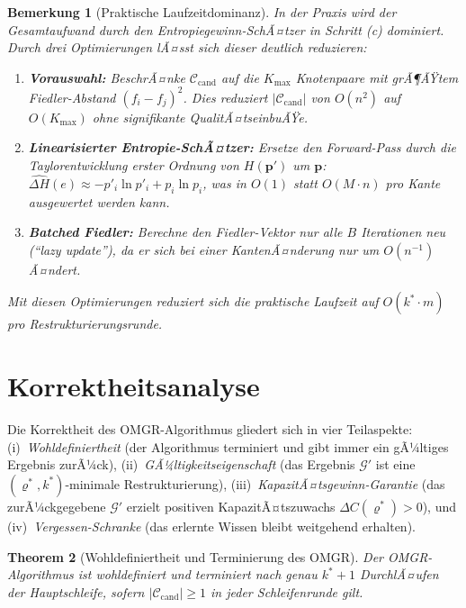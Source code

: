 ﻿\documentclass[12pt, a4paper, openany]{report}
\newtheorem{theorem}{Theorem}[chapter]
\newtheorem{remark}[theorem]{Bemerkung}
\newcommand{\calG}{\mathcal{G}}
\newcommand{\calC}{\mathcal{C}}
\begin{document}
\begin{remark}[Praktische Laufzeitdominanz]
\label{rem:runtime_practical}
In der Praxis wird der Gesamtaufwand durch den Entropiegewinn-SchÃ¤tzer in
Schritt (c) dominiert.  Durch drei Optimierungen lÃ¤sst sich dieser
deutlich reduzieren:
\begin{enumerate}[label=(\roman*)]
  \item \textbf{Vorauswahl:} BeschrÃ¤nke $\calC_{\mathrm{cand}}$ auf die
    $K_{\max}$ Knotenpaare mit grÃ¶ÃŸtem Fiedler-Abstand $(f_i - f_j)^2$.
    Dies reduziert $|\calC_{\mathrm{cand}}|$ von $O(n^2)$ auf $O(K_{\max})$
    ohne signifikante QualitÃ¤tseinbuÃŸe.
  \item \textbf{Linearisierter Entropie-SchÃ¤tzer:} Ersetze den Forward-Pass
    durch die Taylorentwicklung erster Ordnung von $H(\bm{p}')$ um $\bm{p}$:
    $\widehat{\Delta H}(e) \approx -p'_i \ln p'_i + p_i \ln p_i$,
    was in $O(1)$ statt $O(M \cdot n)$ pro Kante ausgewertet werden kann.
  \item \textbf{Batched Fiedler:} Berechne den Fiedler-Vektor nur alle
    $B$ Iterationen neu (``lazy update''), da er sich bei einer
    KantenÃ¤nderung nur um $O(n^{-1})$ Ã¤ndert.
\end{enumerate}
Mit diesen Optimierungen reduziert sich die praktische Laufzeit auf
$O(k^* \cdot m)$ pro Restrukturierungsrunde.
\end{remark}

\section{Korrektheitsanalyse}
\label{sec:algo_correctness}

Die Korrektheit des OMGR-Algorithmus gliedert sich in vier Teilaspekte:
(i)~\emph{Wohldefiniertheit} (der Algorithmus terminiert und gibt immer
ein gÃ¼ltiges Ergebnis zurÃ¼ck), (ii)~\emph{GÃ¼ltigkeitseigenschaft}
(das Ergebnis $\calG'$ ist eine $(\varrho^*, k^*)$-minimale Restrukturierung),
(iii)~\emph{KapazitÃ¤tsgewinn-Garantie} (das zurÃ¼ckgegebene $\calG'$
erzielt positiven KapazitÃ¤tszuwachs $\Delta C(\varrho^*) > 0$), und
(iv)~\emph{Vergessen-Schranke} (das erlernte Wissen bleibt weitgehend
erhalten).

\begin{theorem}[Wohldefiniertheit und Terminierung des OMGR]
\label{thm:omgr_welldefined}
Der OMGR-Algorithmus ist wohldefiniert und terminiert nach
genau $k^* + 1$ DurchlÃ¤ufen der Hauptschleife, sofern
$|\calC_{\mathrm{cand}}| \geq 1$ in jeder Schleifenrunde gilt.
\end{theorem}
\end{document}
